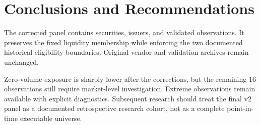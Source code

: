 \section{Conclusions and Recommendations}

The corrected panel contains \FinalSecurities{} securities,
\FinalIssuers{} issuers, and \FinalObservations{} validated observations. It
preserves the fixed liquidity membership while enforcing the two documented
historical eligibility boundaries. Original vendor and validation archives
remain unchanged.

Zero-volume exposure is sharply lower after the corrections, but the remaining
16 observations still require market-level investigation. Extreme observations
remain available with explicit diagnostics. Subsequent research should treat
the final v2 panel as a documented retrospective research cohort, not as a
complete point-in-time executable universe.
